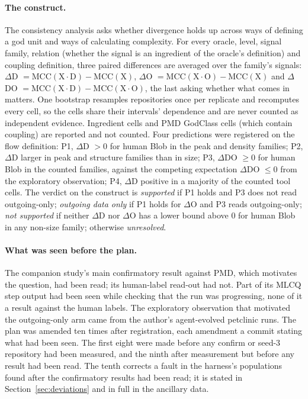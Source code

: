 \documentclass[11pt,a4paper]{article}
\newcommand{\dD}{$\Delta$D}
\newcommand{\dO}{$\Delta$O}
\newcommand{\dDO}{$\Delta$DO}
\begin{document}
\paragraph{The construct.} The consistency analysis asks whether divergence
holds up across ways of defining a god unit and ways of calculating
complexity. For every oracle, level, signal family, relation (whether the
signal is an ingredient of the oracle's definition) and coupling definition,
three paired differences are averaged over the family's signals: \dD{}
$= \mathrm{MCC}(\mathrm{X}\cdot\mathrm{D}) - \mathrm{MCC}(\mathrm{X})$,
\dO{} $= \mathrm{MCC}(\mathrm{X}\cdot\mathrm{O}) - \mathrm{MCC}(\mathrm{X})$
and \dDO{} $= \mathrm{MCC}(\mathrm{X}\cdot\mathrm{D}) -
\mathrm{MCC}(\mathrm{X}\cdot\mathrm{O})$, the last asking whether what comes
in matters. One bootstrap resamples repositories once per replicate and
recomputes every cell, so the cells share their intervals' dependence and
are never counted as independent evidence. Ingredient cells and PMD
GodClass cells (which contain coupling) are reported and not counted. Four
predictions were registered on the flow definition: P1, \dD{} $> 0$ for
human Blob in the peak and density families; P2, \dD{} larger in peak and
structure families than in size; P3, \dDO{} $\geq 0$ for human Blob in the
counted families, against the competing expectation \dDO{} $\leq 0$ from the
exploratory observation; P4, \dD{} positive in a majority of the counted
tool cells. The verdict on the construct is \emph{supported} if P1 holds
and P3 does not read outgoing-only; \emph{outgoing data only} if P1 holds
for \dO{} and P3 reads outgoing-only; \emph{not supported} if neither \dD{}
nor \dO{} has a lower bound above 0 for human Blob in any non-size family;
otherwise \emph{unresolved}.

\paragraph{What was seen before the plan.} The companion study's main
confirmatory result against PMD, which motivates the question, had been
read; its human-label read-out had not. Part of its MLCQ step output had
been seen while checking that the run was progressing, none of it a result
against the human labels. The exploratory observation that motivated the
outgoing-only arm came from the author's agent-evolved petclinic runs. The
plan was amended ten times after registration, each amendment a commit
stating what had been seen. The first eight were made before any confirm or
seed-3 repository had been measured, and the ninth after measurement but
before any result had been read. The tenth corrects a fault in the
harness's populations found after the confirmatory results had been read;
it is stated in Section~\ref{sec:deviations} and in full in the ancillary
data.
\end{document}
